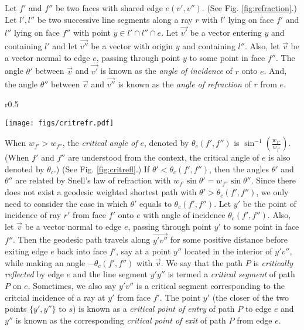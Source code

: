 \documentclass[11pt]{article}
\begin{document}
Let $f'$ and $f''$ be two faces with shared edge $e(v', v'')$.
(See Fig. \ref{fig:refraction}.)
Let $l', l''$ be two successive line segments along a ray $r$ with $l'$ lying on face $f'$ and $l''$ lying on face $f''$ with point $y \in l' \cap l'' \cap e$.
Let $\overrightarrow{v'}$ be a vector entering $y$ and containing $l'$ and let $\overrightarrow{v''}$ be a vector with origin $y$ and containing $l''$.
Also, let $\overrightarrow{v}$ be a vector normal to edge $e$, passing through point $y$ to some point in face $f''$. 
The angle $\theta'$ between $\overrightarrow{v}$ and $\overrightarrow{v'}$ is known as the {\it angle of incidence} of $r$ onto $e$.
And, the angle $\theta''$ between $\overrightarrow{v}$ and $\overrightarrow{v''}$ is known as the {\it angle of refraction} of $r$ from $e$.

	\begin{wrapfigure}{r}{0.5\textwidth}
	\centering
	\begin{minipage}[t]{\linewidth}
	\centering
	\texttt{[image: figs/critrefr.pdf]}
	\caption{\footnotesize Illustrating critical reflection}
	\label{fig:critrefl}
	\end{minipage}
	\end{wrapfigure}

When $w_{f'} > w_{f''}$, the {\it critical angle of $e$}, denoted by $\theta_c(f', f'')$ is $\sin^{-1}(\frac{w_{f''}}{w_{f'}})$.
(When $f'$ and $f''$ are understood from the context, the critical angle of $e$ is also denoted by $\theta_c$.)
(See Fig. \ref{fig:critrefl}.)
If $\theta' < \theta_c(f', f'')$, then the angles $\theta'$ and $\theta''$ are related by Snell's law of refraction with $w_{f'} \sin{\theta'} = w_{f''} \sin{\theta''}$.
Since there does not exist a geodesic weighted shortest path with $\theta' > \theta_c(f', f'')$, we only need to consider the case in which $\theta'$ equals to $\theta_c(f', f'')$. 
Let $y'$ be the point of incidence of ray $r'$ from face $f'$ onto $e$ with angle of incidence $\theta_c(f', f'')$.
Also, let $\overrightarrow{v}$ be a vector normal to edge $e$, passing through point $y'$ to some point in face $f''$.
Then the geodesic path travels along $\overrightarrow{y'v''}$ for some positive distance before exiting edge $e$ back into face $f'$, say at a point $y''$ located in the interior of $y'v''$, while making an angle $-\theta_c(f', f'')$ with $\overrightarrow{v}$. 
We say that the path $P$ is {\it critically reflected} by edge $e$ and the line segment $y'y''$ is termed a {\it critical segment} of path $P$ on $e$.
Sometimes, we also say $y'v''$ is a critical segment corresponding to the critcial incidence of a ray at $y'$ from face $f'$.
The point $y'$ (the closer of the two points $\{y', y''\}$ to $s$) is known as a {\it critical point of entry} of path $P$ to edge $e$ and $y''$ is known as the corresponding {\it critical point of exit} of path $P$ from edge $e$.
\end{document}
